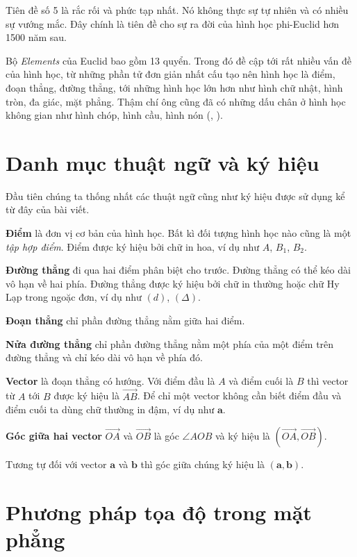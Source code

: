 Tiên đề số 5 là rắc rối và phức tạp nhất. Nó không thực sự tự nhiên và có nhiều sự vướng mắc. Đây chính là tiên đề cho sự ra đời của hình học phi-Euclid hơn 1500 năm sau.

Bộ \textit{Elements} của Euclid bao gồm 13 quyển. Trong đó đề cập tới rất nhiều vấn đề của hình học, từ những phần tử đơn giản nhất cấu tạo nên hình học là điểm, đoạn thẳng, đường thẳng, tới những hình học lớn hơn như hình chữ nhật, hình tròn, đa giác, mặt phẳng. Thậm chí ông cũng đã có những dấu chân ở hình học không gian như hình chóp, hình cầu, hình nón (\cite{Euclid}, \cite{Casey2007}).

\section{Danh mục thuật ngữ và ký hiệu}

Đầu tiên chúng ta thống nhất các thuật ngữ cũng như ký hiệu được sử dụng kể từ đây của bài viết.

\textbf{Điểm} là đơn vị cơ bản của hình học. Bất kì đối tượng hình học nào cũng là một \textit{tập hợp điểm}. Điểm được ký hiệu bởi chữ in hoa, ví dụ như $A$, $B_1$, $B_2$.

\textbf{Đường thẳng} đi qua hai điểm phân biệt cho trước. Đường thẳng có thể kéo dài vô hạn về hai phía. Đường thẳng được ký hiệu bởi chữ in thường hoặc chữ Hy Lạp trong ngoặc đơn, ví dụ như $(d)$, $(\Delta)$.

\textbf{Đoạn thẳng} chỉ phần đường thẳng nằm giữa hai điểm.

\textbf{Nửa đường thẳng} chỉ phần đường thẳng nằm một phía của một điểm trên đường thẳng và chỉ kéo dài vô hạn về phía đó.

\textbf{Vector} là đoạn thẳng có hướng. Với điểm đầu là $A$ và điểm cuối là $B$ thì vector từ $A$ tới $B$ được ký hiệu là $\overrightarrow{AB}$. Để chỉ một vector không cần biết điểm đầu và điểm cuối ta dùng chữ thường in đậm, ví dụ như $\bm{a}$.

\textbf{Góc giữa hai vector} $\overrightarrow{OA}$ và $\overrightarrow{OB}$ là góc $\angle AOB$ và ký hiệu là $(\overrightarrow{OA}, \overrightarrow{OB})$.

Tương tự đối với vector $\bm{a}$ và $\bm{b}$ thì góc giữa chúng ký hiệu là $(\bm{a}, \bm{b})$.

\section{Phương pháp tọa độ trong mặt phẳng}

